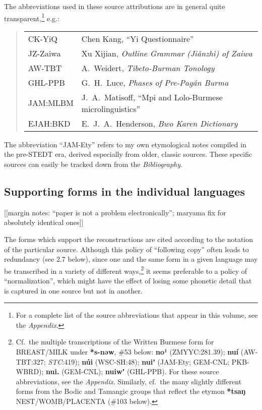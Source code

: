 The abbreviations used in these source attributions are in general quite
transparent,\footnote{For a complete list of the source abbreviations that
appear in this volume, see the \textit{Appendix}.} e.g.:

\begin{quote}
\begin{tabular}{ll}
CK-YiQ	&Chen Kang, “Yi Questionnaire”\\
JZ-Zaiwa	&Xu Xijian, \textit{Outline Grammar (Jiǎnzhì) of Zaiwa}\\
AW-TBT	&A.~Weidert, \textit{Tibeto-Burman Tonology}\\
GHL-PPB	&G.~H.~Luce, \textit{Phases of Pre-Pagán Burma}\\
JAM:MLBM	&J.~A.~Matisoff, “Mpi and Lolo-Burmese microlinguistics”\\
EJAH:BKD	&E.~J.~A.~Henderson, \textit{Bwo Karen Dictionary}\\
\end{tabular}
\end{quote}

The abbreviation “JAM-Ety” refers to my own etymological notes compiled in the
pre-STEDT era, derived especially from older, classic sources.  These specific
sources can easily be tracked down from the \textit{Bibliography}.

\subsection{Supporting forms in the individual languages}

[[margin notes: ``paper is not a problem electronically''; maryama fix for absolutely identical ones]]

The forms which support the reconstructions are cited according to the
notation of the particular source.  Although this policy of “following copy”
often leads to redundancy (see 2.7 below), since one and the same form in a
given language may be transcribed in a variety of different ways,\footnote{Cf.\ the
multiple transcriptions of the Written Burmese form for BREAST/MILK under
\textbf{*s-nəw}, \#53 below:  \textbf{no¹}
(ZMYYC:281.39); \textbf{nuí} (AW-TBT:327; \textit{STC}:419); \textbf{núi}
(WSC-SH:48); \textbf{nuiʼ} (JAM-Ety; GEM-CNL; PKB-WBRD);
\textbf{nui.} (GEM-CNL); \textbf{nuiwʼ} (GHL-PPB).
 For these source abbreviations, see the \textit{Appendix}. Similarly, cf.\ the many slightly different forms from the Bodic and Tamangic groups that reflect the etymon \textbf{*tsaŋ} NEST/WOMB/PLACENTA (\#103 below).} it seems preferable to a
policy of “normalization”, which might have the effect of losing some phonetic
detail that is captured in one source but not in another.

